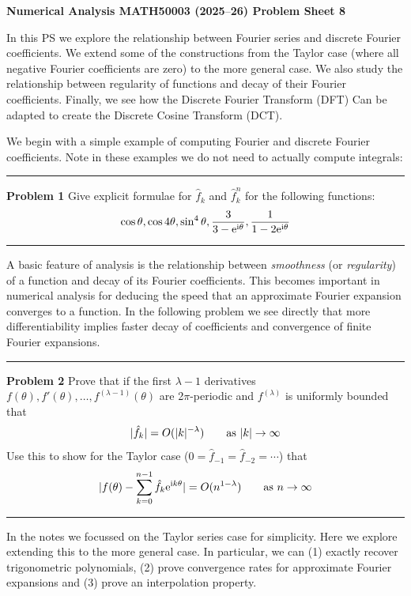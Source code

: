 \documentclass[12pt,a4paper]{article}
\def\endash{–}
\begin{document}
\textbf{Numerical Analysis MATH50003 (2025\ensuremath{\endash}26) Problem Sheet 8}

In this PS we explore the relationship between Fourier series and discrete Fourier coefficients.  We extend some of the constructions from the Taylor case (where all negative Fourier coefficients are zero) to the more general case. We also study the relationship between regularity of functions and decay of their Fourier coefficients. Finally, we see how the Discrete Fourier Transform (DFT) Can be adapted to create the Discrete Cosine Transform (DCT).

We begin with a simple example of computing Fourier and discrete Fourier coefficients. Note in these examples we do not need to actually compute integrals:

\rule{\textwidth}{1pt}
\textbf{Problem 1} Give explicit formulae for $\hat f_k$ and $\hat f_k^n$ for the following functions:
\[
\cos \ensuremath{\theta}, \cos 4\ensuremath{\theta}, \sin^4\ensuremath{\theta}, {3 \over 3 - {\rm e}^{\rm i \ensuremath{\theta}}}, {1 \over 1 - 2{\rm e}^{\rm i \ensuremath{\theta}}}
\]
\rule{\textwidth}{1pt}
A basic feature of analysis is the relationship between \emph{smoothness} (or \emph{regularity}) of a function and decay of its Fourier coefficients. This becomes important in numerical analysis for deducing the speed that an approximate Fourier expansion  converges to a function. In the following problem we see directly that more differentiability implies faster decay of coefficients and convergence of finite Fourier expansions.

\rule{\textwidth}{1pt}
\textbf{Problem 2} Prove that if the first $\ensuremath{\lambda}-1$ derivatives $f(\ensuremath{\theta}), f'(\ensuremath{\theta}), \ensuremath{\ldots}, f^{(\ensuremath{\lambda}-1)}(\ensuremath{\theta})$ are 2\ensuremath{\pi}-periodic and $f^{(\ensuremath{\lambda})}$ is uniformly bounded  that
\[
|\hat f_k| = O(|k|^{-\ensuremath{\lambda}})\qquad \hbox{as $|k| \ensuremath{\rightarrow} \ensuremath{\infty}$}
\]
Use this to show for the Taylor case ($0 = \hat f_{-1} = \hat f_{-2} = \ensuremath{\cdots}$) that
\[
|f(\ensuremath{\theta}) - \ensuremath{\sum}_{k=0}^{n-1} \hat f_k {\rm e}^{{\rm i}k\ensuremath{\theta}}| = O(n^{1-\ensuremath{\lambda}})\qquad \hbox{as $n \ensuremath{\rightarrow} \ensuremath{\infty}$}
\]
\rule{\textwidth}{1pt}
In the notes we focussed on the Taylor series case for simplicity. Here we explore extending this to the more general case.  In particular, we can (1) exactly recover trigonometric polynomials, (2) prove convergence rates for approximate Fourier expansions and (3) prove an interpolation property.
\end{document}
